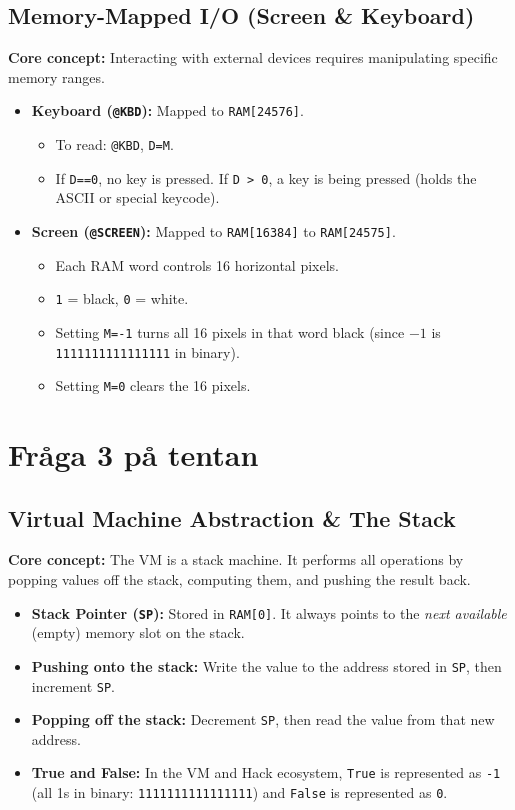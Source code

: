 \documentclass[12pt,a4paper]{article}
\begin{document}
\subsection{Memory-Mapped I/O (Screen \& Keyboard)}
\textbf{Core concept:} Interacting with external devices requires manipulating specific memory ranges.
\begin{itemize}
    \item \textbf{Keyboard (\texttt{@KBD}):} Mapped to \texttt{RAM[24576]}. 
    \begin{itemize}
        \item To read: \texttt{@KBD}, \texttt{D=M}.
        \item If \texttt{D==0}, no key is pressed. If \texttt{D > 0}, a key is being pressed (holds the ASCII or special keycode).
    \end{itemize}
    \item \textbf{Screen (\texttt{@SCREEN}):} Mapped to \texttt{RAM[16384]} to \texttt{RAM[24575]}. 
    \begin{itemize}
        \item Each RAM word controls 16 horizontal pixels. 
        \item \texttt{1} = black, \texttt{0} = white. 
        \item Setting \texttt{M=-1} turns all 16 pixels in that word black (since $-1$ is \texttt{1111111111111111} in binary).
        \item Setting \texttt{M=0} clears the 16 pixels.
    \end{itemize}
\end{itemize}

\newpage
\section{Fråga 3 på tentan}
\subsection{Virtual Machine Abstraction \& The Stack}
\textbf{Core concept:} The VM is a stack machine. It performs all operations by popping values off the stack, computing them, and pushing the result back. 
\begin{itemize}
    \item \textbf{Stack Pointer (\texttt{SP}):} Stored in \texttt{RAM[0]}. It always points to the \textit{next available} (empty) memory slot on the stack.
    \item \textbf{Pushing onto the stack:} Write the value to the address stored in \texttt{SP}, then increment \texttt{SP}.
    \item \textbf{Popping off the stack:} Decrement \texttt{SP}, then read the value from that new address.
    \item \textbf{True and False:} In the VM and Hack ecosystem, \texttt{True} is represented as \texttt{-1} (all 1s in binary: \texttt{1111111111111111}) and \texttt{False} is represented as \texttt{0}.
\end{itemize}
\end{document}
